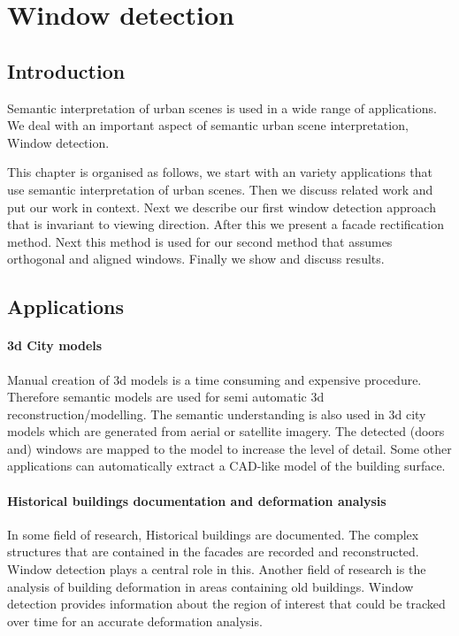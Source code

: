 

\section{Window detection}
\label{sec:windowDetection}
\subsection{Introduction}
Semantic interpretation of urban scenes is used in a wide range of applications.
We deal with an important aspect of semantic urban scene interpretation, Window detection. 

This chapter is organised as follows, we start with an variety applications that
use semantic interpretation of urban scenes.  Then we discuss related work and
put our work in context.  Next we describe our first window detection approach
that is invariant to viewing direction.  After this we present a facade
rectification method. Next this method is used for our second method that assumes
orthogonal and aligned windows.  Finally we show and discuss results. 

\subsection{Applications}
\paragraph{3d City models} 
	Manual creation of 3d models is a time consuming and expensive procedure.
	Therefore semantic models are used for semi automatic 3d
	reconstruction/modelling.
	The semantic understanding is also used in 3d city models which are
	generated from aerial or satellite imagery.  The detected (doors and)
	windows are mapped to the model to increase the level of detail. 
	Some other applications can automatically extract a CAD-like model of
	the building surface.

\paragraph{Historical buildings documentation and deformation analysis}
	In some field of research, Historical buildings are documented. The complex
	structures that are contained in the facades are recorded and reconstructed.
	Window detection plays a central role in this. 
	Another field of research is the analysis of building deformation in areas
	containing old buildings.  Window detection provides information about the
	region of interest that could be tracked over time for an accurate
	deformation analysis.


